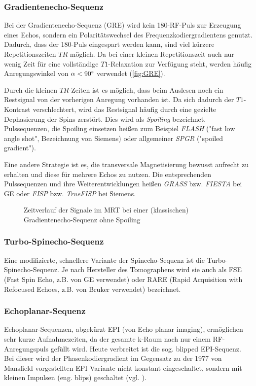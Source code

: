 \subsubsection{Gradientenecho-Sequenz}
\label{sec:GRE}
Bei der Gradientenecho-Sequenz (GRE) wird kein 180\degree-RF-Puls zur Erzeugung eines Echos, sondern ein Polaritätswechsel des Frequenzkodiergradientens genutzt. Dadurch, dass der 180\degree-Puls eingespart werden kann, sind viel kürzere Repetitionszeiten $TR$ möglich. Da bei einer kleinen Repetitionszeit auch nur wenig Zeit für eine vollständige $T1$-Relaxation zur Verfügung steht, werden häufig Anregungswinkel von $\alpha<90\degree$ verwendet (\autoref{fig:GRE}).

Durch die kleinen $TR$-Zeiten ist es möglich, dass beim Auslesen noch ein Restsignal von der vorherigen Anregung vorhanden ist. Da sich dadurch der $T1$-Kontrast verschlechtert, wird das Restsignal häufig durch eine gezielte Dephasierung der Spins zerstört. Dies wird als \textit{Spoiling} bezeichnet. Pulssequenzen, die Spoiling einsetzen heißen zum Beispiel \textit{FLASH} ("fast low angle shot", Bezeichnung von Siemens) oder allgemeiner \textit{SPGR} ("spoiled gradient").

Eine andere Strategie ist es, die transversale Magnetisierung bewusst aufrecht zu erhalten und diese für mehrere Echos zu nutzen. Die entsprechenden Pulssequenzen und ihre Weiterentwicklungen heißen \textit{GRASS} bzw. \textit{FIESTA} bei GE oder \textit{FISP} bzw. \textit{TrueFISP} bei Siemens.

\begin{figure}[H]
	\centering
	\caption[Gradientenecho-Sequenz]{Zeitverlauf der Signale im MRT bei einer (klassischen) Gradientenecho-Sequenz ohne Spoiling}
	\label{fig:GRE}
\end{figure}

\subsubsection{Turbo-Spinecho-Sequenz}
Eine modifizierte, schnellere Variante der Spinecho-Sequenz ist die Turbo-Spinecho-Sequenz. Je nach Hersteller des Tomographens wird sie auch als FSE (Fast Spin Echo, z.B. von GE verwendet) oder RARE (Rapid Acquisition with Refocused Echoes, z.B. von Bruker verwendet) bezeichnet.

\subsubsection{Echoplanar-Sequenz}
Echoplanar-Sequenzen, abgekürzt EPI (von Echo planar imaging), ermöglichen sehr kurze Aufnahmezeiten, da der gesamte k-Raum nach nur einem RF-Anregungspuls gefüllt wird. Heute verbreitet ist die sog. blipped EPI-Sequenz. Bei dieser wird der Phasenkodiergradient im Gegensatz zu der 1977 von Mansfield vorgestellten EPI Variante nicht konstant eingeschaltet, sondern mit kleinen Impulsen (eng. blips) geschaltet (vgl. \cite[S.~299]{Bushong2014}).

